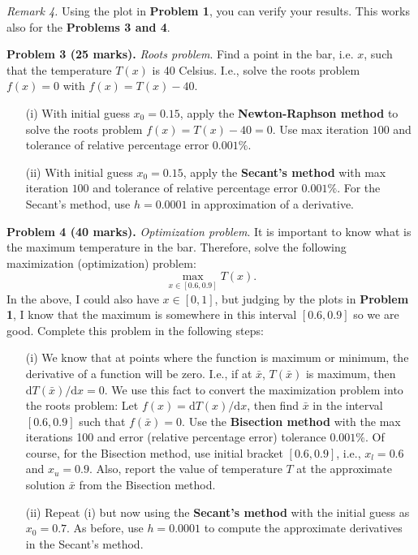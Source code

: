 \documentclass[11pt,a4paper]{report}
\newcommand{\dd}{\mathrm{d}}
\begin{document}
\noindent\textit{Remark 4.} Using the plot in \textbf{Problem 1}, you can verify your results. This works also for the \textbf{Problems 3 and 4}.

\vspace{10pt}
\noindent\textbf{Problem 3 (25 marks).} \textit{Roots problem}. Find a point in the bar, i.e. $x$, such that the temperature $T(x)$ is 40 Celsius. I.e., solve the roots problem $f(x) = 0$ with $f(x) = T(x) - 40$. 
\begin{itemize}
  \item[(i)] With initial guess $x_0 = 0.15$, apply the \textbf{Newton-Raphson method} to solve the roots problem $f(x) = T(x) - 40 = 0$. Use max iteration $100$ and tolerance of relative percentage error $0.001\%$.
  
  \item[(ii)] With initial guess $x_0 = 0.15$, apply the \textbf{Secant's method} with max iteration $100$ and tolerance of relative percentage error $0.001\%$. For the Secant's method, use $h=0.0001$ in approximation of a derivative.
\end{itemize}

\vspace{10pt}
\noindent\textbf{Problem 4 (40 marks).} \textit{Optimization problem}. It is important to know what is the maximum temperature in the bar. Therefore, solve the following maximization (optimization) problem:
\begin{equation}
  \max_{x\in [0.6,0.9]} T(x).
\end{equation}
In the above, I could also have $x \in [0,1]$, but judging by the plots in \textbf{Problem 1}, I know that the maximum is somewhere in this interval $[0.6, 0.9]$ so we are good. Complete this problem in the following steps:

\begin{itemize}
  \item[(i)] We know that at points where the function is maximum or minimum, the derivative of a function will be zero. I.e., if at $\bar{x}$, $T(\bar{x})$ is maximum, then $\dd T (\bar{x})/\dd x = 0$. We use this fact to convert the maximization problem into  the roots problem: Let $f(x) = \dd T(x) / \dd x$, then find $\bar{x}$ in the interval $[0.6, 0.9]$ such that $f(\bar{x}) = 0$. Use the \textbf{Bisection method} with the max iterations 100 and error (relative percentage error) tolerance $0.001\%$. Of course, for the Bisection method, use  initial bracket $[0.6, 0.9]$, i.e., $x_l = 0.6$ and $x_u = 0.9$. Also, report the value of temperature $T$ at the approximate solution $\bar{x}$ from the Bisection method. 

\item[(ii)] Repeat (i)  but now using the \textbf{Secant's method} with the initial guess as $x_0 = 0.7$. As before, use $h = 0.0001$ to compute the approximate derivatives in the Secant's method. 
\end{itemize}
\end{document}

